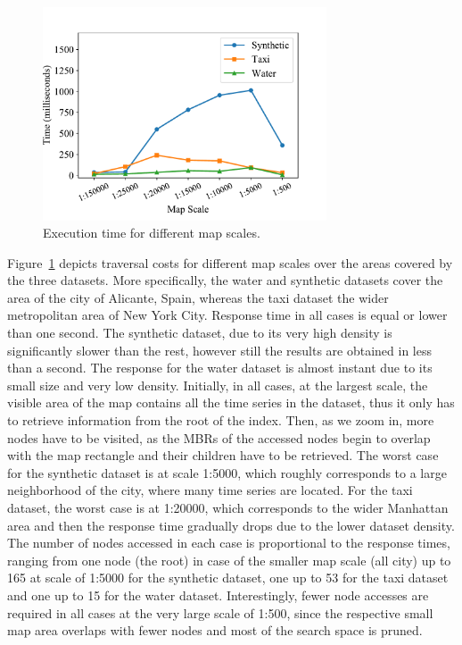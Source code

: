 \begin{figure}[!ht]
 \centering
 \includegraphics[width=0.75\textwidth]{figures/BTSR_zoom.pdf}
 \caption{Execution time for different map scales.}
 \label{fig:btsr_zoom}
\end{figure}


Figure~\ref{fig:btsr_zoom} depicts traversal costs for different map scales over the areas covered by the three datasets. More specifically, the water and synthetic datasets cover the area of the city of Alicante, Spain, whereas the taxi dataset the wider metropolitan area of New York City. Response time in all cases is equal or lower than one second. The synthetic dataset, due to its very high density is significantly slower than the rest, however still the results are obtained in less than a second. The response for the water dataset is almost instant due to its small size and very low density. Initially, in all cases, at the largest scale, the visible area of the map contains all the time series in the dataset, thus it only has to retrieve information from the root of the index. Then, as we zoom in, more nodes have to be visited, as the MBRs of the accessed nodes begin to overlap with the map rectangle and their children have to be retrieved. The worst case for the synthetic dataset is at scale 1:5000, which roughly corresponds to a large neighborhood of the city, where many time series are located. For the taxi dataset, the worst case is at 1:20000, which corresponds to the wider Manhattan area and then the response time gradually drops due to the lower dataset density. The number of nodes accessed in each case is proportional to the response times, ranging from one node (the root) in case of the smaller map scale (all city) up to 165 at scale of 1:5000 for the synthetic dataset, one up to 53 for the taxi dataset and one up to 15 for the water dataset. Interestingly, fewer node accesses are required in all cases at the very large scale of 1:500, since the respective small map area overlaps with fewer nodes and most of the search space is pruned. 


